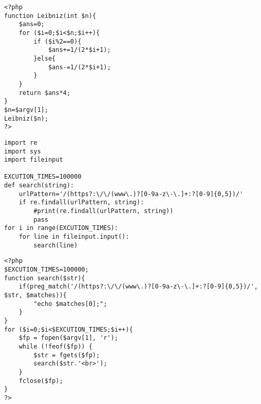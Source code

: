 \begin{lstlisting}[label={fig:p-php}, caption={PHP 円周率の算出}, basicstyle=\ttfamily\footnotesize, frame=single]
<?php
function Leibniz(int $n){
    $ans=0;
    for ($i=0;$i<$n;$i++){
        if ($i%2==0){
            $ans+=1/(2*$i+1);
        }else{
            $ans-=1/(2*$i+1);
        }
    }
    return $ans*4;
}
$n=$argv[1];
Leibniz($n);
?>
\end{lstlisting}

\clearpage

\begin{lstlisting}[label={fig:s-py}, caption={Python3 正規表現}, basicstyle=\ttfamily\footnotesize, frame=single]
import re
import sys
import fileinput

EXCUTION_TIMES=100000
def search(string):
    urlPattern='/(https?:\/\/(www\.)?[0-9a-z\-\.]+:?[0-9]{0,5})/'
    if re.findall(urlPattern, string):
        #print(re.findall(urlPattern, string))
        pass
for i in range(EXCUTION_TIMES):
    for line in fileinput.input():
        search(line)
\end{lstlisting}

\begin{lstlisting}[label={fig:s-php}, caption={PHP 正規表現}, basicstyle=\ttfamily\footnotesize, frame=single]
<?php
$EXCUTION_TIMES=100000;
function search($str){
    if(preg_match('/(https?:\/\/(www\.)?[0-9a-z\-\.]+:?[0-9]{0,5})/', $str, $matches)){
        "echo $matches[0];";
    }
}
for ($i=0;$i<$EXCUTION_TIMES;$i++){
    $fp = fopen($argv[1], 'r');
    while (!feof($fp)) {
        $str = fgets($fp);
        search($str.'<br>');
    }
    fclose($fp);
}
?>
\end{lstlisting}